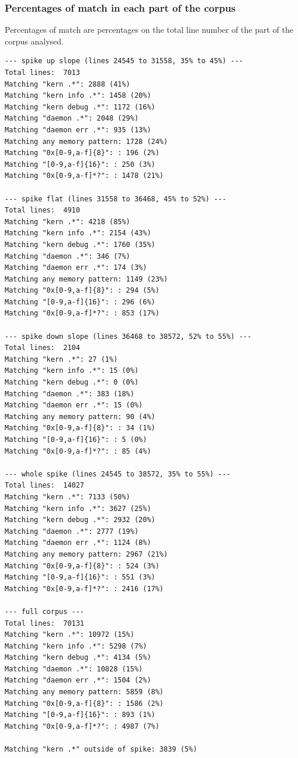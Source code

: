 \subsubsection{Percentages of match in each part of the
corpus}

Percentages of match are percentages on the total line number of the
part of the corpus analysed.

\begin{lstlisting}
--- spike up slope (lines 24545 to 31558, 35% to 45%) ---
Total lines:  7013
Matching "kern .*": 2888 (41%)
Matching "kern info .*": 1458 (20%)
Matching "kern debug .*": 1172 (16%)
Matching "daemon .*": 2048 (29%)
Matching "daemon err .*": 935 (13%)
Matching any memory pattern: 1728 (24%)
Matching "0x[0-9,a-f]{8}": : 196 (2%)
Matching "[0-9,a-f]{16}": : 250 (3%)
Matching "0x[0-9,a-f]*?": : 1478 (21%)

--- spike flat (lines 31558 to 36468, 45% to 52%) ---
Total lines:  4910
Matching "kern .*": 4218 (85%)
Matching "kern info .*": 2154 (43%)
Matching "kern debug .*": 1760 (35%)
Matching "daemon .*": 346 (7%)
Matching "daemon err .*": 174 (3%)
Matching any memory pattern: 1149 (23%)
Matching "0x[0-9,a-f]{8}": : 294 (5%)
Matching "[0-9,a-f]{16}": : 296 (6%)
Matching "0x[0-9,a-f]*?": : 853 (17%)

--- spike down slope (lines 36468 to 38572, 52% to 55%) ---
Total lines:  2104
Matching "kern .*": 27 (1%)
Matching "kern info .*": 15 (0%)
Matching "kern debug .*": 0 (0%)
Matching "daemon .*": 383 (18%)
Matching "daemon err .*": 15 (0%)
Matching any memory pattern: 90 (4%)
Matching "0x[0-9,a-f]{8}": : 34 (1%)
Matching "[0-9,a-f]{16}": : 5 (0%)
Matching "0x[0-9,a-f]*?": : 85 (4%)

--- whole spike (lines 24545 to 38572, 35% to 55%) ---
Total lines:  14027
Matching "kern .*": 7133 (50%)
Matching "kern info .*": 3627 (25%)
Matching "kern debug .*": 2932 (20%)
Matching "daemon .*": 2777 (19%)
Matching "daemon err .*": 1124 (8%)
Matching any memory pattern: 2967 (21%)
Matching "0x[0-9,a-f]{8}": : 524 (3%)
Matching "[0-9,a-f]{16}": : 551 (3%)
Matching "0x[0-9,a-f]*?": : 2416 (17%)

--- full corpus ---
Total lines:  70131
Matching "kern .*": 10972 (15%)
Matching "kern info .*": 5298 (7%)
Matching "kern debug .*": 4134 (5%)
Matching "daemon .*": 10828 (15%)
Matching "daemon err .*": 1504 (2%)
Matching any memory pattern: 5859 (8%)
Matching "0x[0-9,a-f]{8}": : 1586 (2%)
Matching "[0-9,a-f]{16}": : 893 (1%)
Matching "0x[0-9,a-f]*?": : 4987 (7%)

Matching "kern .*" outside of spike: 3839 (5%)
\end{lstlisting}

